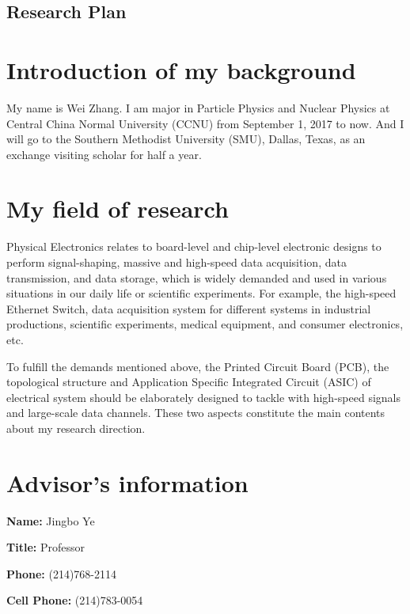 \documentclass[11pt,a4paper]{article}
\begin{document}
\begin{spacing}{1.25}           %

\begin{center}
\section*{\huge Research Plan}
\end{center}

\section*{Introduction of my background}    %
My name is Wei Zhang. I am major in Particle Physics and Nuclear Physics at Central China Normal University (CCNU) from September 1, 2017 to now. And I will go to the Southern Methodist University (SMU), Dallas, Texas, as an exchange visiting scholar for half a year.
\section*{My field of research}    %
Physical Electronics relates to board-level and chip-level electronic designs to perform signal-shaping, massive and high-speed data acquisition, data transmission, and data storage, which is widely demanded and used in various situations in our daily life or scientific experiments. For example, the high-speed Ethernet Switch, data acquisition system for different systems in industrial productions, scientific experiments, medical equipment, and consumer electronics, etc.

To fulfill the demands mentioned above, the Printed Circuit Board (PCB), the topological structure and Application Specific Integrated Circuit (ASIC) of electrical system should be elaborately designed to tackle with high-speed signals and large-scale data channels. These two aspects constitute the main contents about my research direction.

\section*{Advisor's information}     %
\begin{multicols}{2}
\textbf{Name:} Jingbo Ye   

\textbf{Title:} Professor 

\textbf{Phone:} (214)768-2114

\textbf{Cell Phone:} (214)783-0054


\end{multicols}
\end{spacing}
\end{document}
